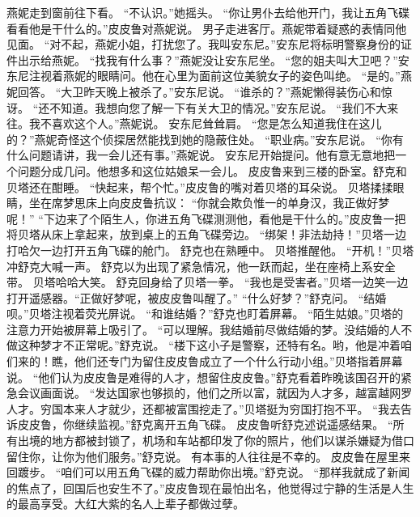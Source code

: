 \documentclass[a4paper,12pt,UTF8,twoside]{ctexbook}
\begin{document}
        燕妮走到窗前往下看。 
        “不认识。”她摇头。 
        “你让男仆去给他开门，我让五角飞碟看看他是干什么的。”皮皮鲁对燕妮说。 
        男子走进客厅。燕妮带着疑惑的表情同他见面。 
        “对不起，燕妮小姐，打扰您了。我叫安东尼。”安东尼将标明警察身份的证件出示给燕妮。 
        “找我有什么事？”燕妮没让安东尼坐。 
        “您的姐夫叫大卫吧？”安东尼注视着燕妮的眼睛问。他在心里为面前这位美貌女子的姿色叫绝。 
        “是的。”燕妮回答。 
        “大卫昨天晚上被杀了。”安东尼说。 
        “谁杀的？”燕妮懒得装伤心和惊讶。 
        “还不知道。我想向您了解一下有关大卫的情况。”安东尼说。 
        “我们不大来往。我不喜欢这个人。”燕妮说。 
        安东尼耸耸肩。 
        “您是怎么知道我住在这儿的？”燕妮奇怪这个侦探居然能找到她的隐蔽住处。 
        “职业病。”安东尼说。 
        “你有什么问题请讲，我一会儿还有事。”燕妮说。 
        安东尼开始提问。他有意无意地把一个问题分成几问。他想多和这位姑娘呆一会儿。 
        皮皮鲁来到三楼的卧室。舒克和贝塔还在酣睡。 
        “快起来，帮个忙。”皮皮鲁的嘴对着贝塔的耳朵说。 
        贝塔揉揉眼睛，坐在席梦思床上向皮皮鲁抗议： 
        “你就会欺负惟一的单身汉，我正做好梦呢！” 
        “下边来了个陌生人，你进五角飞碟测测他，看他是干什么的。”皮皮鲁一把将贝塔从床上拿起来，放到桌上的五角飞碟旁边。 
        “绑架！非法劫持！”贝塔一边打哈欠一边打开五角飞碟的舱门。 
        舒克也在熟睡中。 
        贝塔推醒他。 
        “开机！”贝塔冲舒克大喊一声。 
        舒克以为出现了紧急情况，他一跃而起，坐在座椅上系安全带。 
        贝塔哈哈大笑。 
        舒克回身给了贝塔一拳。 
        “我也是受害者。”贝塔一边笑一边打开遥感器。“正做好梦呢，被皮皮鲁叫醒了。” 
        “什么好梦？”舒克问。 
        “结婚呗。”贝塔注视着荧光屏说。 
        “和谁结婚？”舒克也盯着屏幕。 
        “陌生姑娘。”贝塔的注意力开始被屏幕上吸引了。 
        “可以理解。我结婚前尽做结婚的梦。没结婚的人不做这种梦才不正常呢。”舒克说。 
        “楼下这小子是警察，还特有名。哟，他是冲着咱们来的！瞧，他们还专门为留住皮皮鲁成立了一个什么行动小组。”贝塔指着屏幕说。 
        “他们认为皮皮鲁是难得的人才，想留住皮皮鲁。”舒克看着昨晚该国召开的紧急会议画面说。 
        “发达国家也够损的，他们之所以富，就因为人才多，越富越网罗人才。穷国本来人才就少，还都被富围挖走了。”贝塔挺为穷国打抱不平。 
        “我去告诉皮皮鲁，你继续监视。”舒克离开五角飞碟。 
        皮皮鲁听舒克述说遥感结果。 
        “所有出境的地方都被封锁了，机场和车站都印发了你的照片，他们以谋杀嫌疑为借口留住你，让你为他们服务。”舒克说。 
        有本事的人往往是不幸的。 
        皮皮鲁在屋里来回踱步。 
        “咱们可以用五角飞碟的威力帮助你出境。”舒克说。 
        “那样我就成了新闻的焦点了，回国后也安生不了。”皮皮鲁现在最怕出名，他觉得过宁静的生活是人生的最高享受。大红大紫的名人上辈子都做过孽。 
\end{document}
